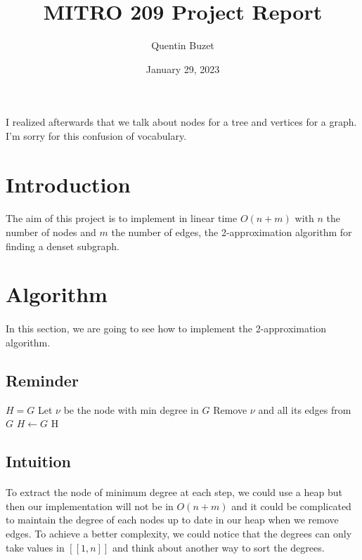 \documentclass[english]{article}
\title{\textbf{MITRO 209 Project Report}}
\author{Quentin Buzet}
\date{January 29, 2023}
\begin{document}
\maketitle
I realized afterwards that we talk about nodes for a tree and vertices for a graph. I'm sorry for this confusion of vocabulary.
\begin{multicols}{2}
\section{Introduction}
\paragraph{}
The aim of this project is to implement in linear time $O(n+m)$ with $n$ the number of nodes and $m$ the number of edges, the 2-approximation algorithm for finding a denset subgraph.
\section{Algorithm}
\paragraph{}
In this section, we are going to see how to implement the 2-approximation algorithm.
\subsection{Reminder}
	\begin{algorithm}[H]
		\caption{2-approximation denset subgraph}
		\begin{algorithmic}
		\STATE $H = G$
			\STATE Let $\nu$ be the node with min degree in $G$
			\STATE Remove $\nu$ and all its edges from $G$
				\STATE $H \leftarrow G$
			\ENDIF
		\ENDWHILE
		\RETURN H
		\end{algorithmic}
	\end{algorithm}
\subsection{Intuition}
\paragraph{}
To extract the node of minimum degree at each step, we could use a heap but then our implementation will not be in $O(n+m)$ and it could be complicated to maintain the degree of each nodes up to date in our heap when we remove edges.
To achieve a better complexity, we could notice that the degrees can only take values in $[[1,n]]$ and think about another way to sort the degrees.

\end{multicols}
\end{document}
